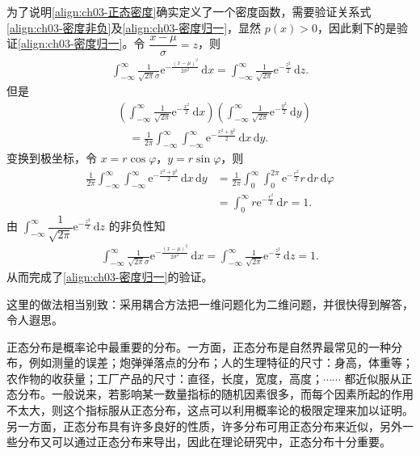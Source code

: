 \documentclass[../../main.tex]{subfiles}
\begin{document}
为了说明\eqref{align:ch03-正态密度}确实定义了一个密度函数，需要验证关系式\eqref{align:ch03-密度非负}及\eqref{align:ch03-密度归一}，显然 $p(x)>0$，因此剩下的是验证\eqref{align:ch03-密度归一}。令 $\dfrac{x-\mu}{\sigma}=z$，则
\begin{align*}\int_{-\infty}^{\infty}\frac{1}{\sqrt{2\pi}\sigma}\mathrm{e}^{-\frac{(x-\mu)^{2}}{2\sigma^{2}}}\,\mathrm{d}x=\int_{-\infty}^{\infty}\frac{1}{\sqrt{2\pi}}\mathrm{e}^{-\frac{z^{2}}{2}}\,\mathrm{d}z.\end{align*}
但是
\begin{align*}
&\left(\int_{-\infty}^{\infty}\frac{1}{\sqrt{2\pi}}\mathrm{e}^{-\frac{x^{2}}{2}}\,\mathrm{d}x\right)\left(\int_{-\infty}^{\infty}\frac{1}{\sqrt{2\pi}}\mathrm{e}^{-\frac{y^{2}}{2}}\,\mathrm{d}y\right)\\
&\quad=\frac{1}{2\pi}\int_{-\infty}^{\infty}\int_{-\infty}^{\infty}\mathrm{e}^{-\frac{x^{2}+y^{2}}{2}}\,\mathrm{d}x\,\mathrm{d}y.
\end{align*}
变换到极坐标，令 $x=r\cos\varphi$，$y=r\sin\varphi$，则
\begin{align*}
\frac{1}{2\pi}\int_{-\infty}^{\infty}\int_{-\infty}^{\infty}\mathrm{e}^{-\frac{x^{2}+y^{2}}{2}}\,\mathrm{d}x\,\mathrm{d}y
&=\frac{1}{2\pi}\int_{0}^{\infty}\int_{0}^{2\pi}\mathrm{e}^{-\frac{r^{2}}{2}}r\,\mathrm{d}r\,\mathrm{d}\varphi\\
&=\int_{0}^{\infty}r\mathrm{e}^{-\frac{r^{2}}{2}}\,\mathrm{d}r=1.
\end{align*}
由 $\int_{-\infty}^{\infty}\dfrac{1}{\sqrt{2\pi}}\mathrm{e}^{-\frac{z^{2}}{2}}\,\mathrm{d}z$ 的非负性知
\begin{align*}\int_{-\infty}^{\infty}\frac{1}{\sqrt{2\pi}\sigma}\mathrm{e}^{-\frac{(x-\mu)^{2}}{2\sigma^{2}}}\,\mathrm{d}x=\int_{-\infty}^{\infty}\frac{1}{\sqrt{2\pi}}\mathrm{e}^{-\frac{z^{2}}{2}}\,\mathrm{d}z=1.\end{align*}
从而完成了\eqref{align:ch03-密度归一}的验证。

这里的做法相当别致：采用耦合方法把一维问题化为二维问题，并很快得到解答，令人遐思。

正态分布是概率论中最重要的分布。一方面，正态分布是自然界最常见的一种分布，例如测量的误差；炮弹弹落点的分布；人的生理特征的尺寸：身高，体重等；农作物的收获量；工厂产品的尺寸：直径，长度，宽度，高度；$\cdots\cdots$ 都近似服从正态分布。一般说来，若影响某一数量指标的随机因素很多，而每个因素所起的作用不太大，则这个指标服从正态分布，这点可以利用概率论的极限定理来加以证明。另一方面，正态分布具有许多良好的性质，许多分布可用正态分布来近似，另外一些分布又可以通过正态分布来导出，因此在理论研究中，正态分布十分重要。
\end{document}
